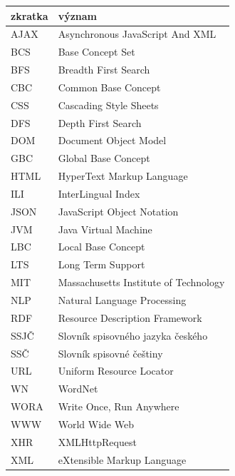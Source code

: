 \documentclass[a4paper,11pt,openany,twoside]{book}
\begin{document}
			\begin{table}[h!]
			\label{tab:seznamzkratek}

				\begin{tabular}{l | l}
					\textbf{zkratka} & \textbf{význam} \\\hline
					AJAX & Asynchronous JavaScript And XML \\
					BCS & Base Concept Set \\
					BFS & Breadth First Search \\
					CBC & Common Base Concept \\
					CSS & Cascading Style Sheets \\
					DFS & Depth	First Search \\
					DOM & Document Object Model \\
					GBC & Global Base Concept \\
					HTML & HyperText Markup Language \\
					ILI & InterLingual Index \\
					JSON & JavaScript Object Notation \\
					JVM & Java Virtual Machine \\
					LBC & Local Base Concept \\
					LTS & Long Term Support \\
					MIT & Massachusetts Institute of Technology \\
					NLP & Natural Language Processing \\
					RDF & Resource Description Framework \\
					SSJČ & Slovník spisovného jazyka českého \\
					SSČ & Slovník spisovné češtiny \\
					URL & Uniform Resource Locator \\
					WN & WordNet \\
					WORA & Write Once, Run Anywhere \\ 
					WWW & World Wide Web \\
					XHR & XMLHttpRequest \\
					XML & eXtensible Markup Language \\
				\end{tabular}
			\end{table}

\end{document}
